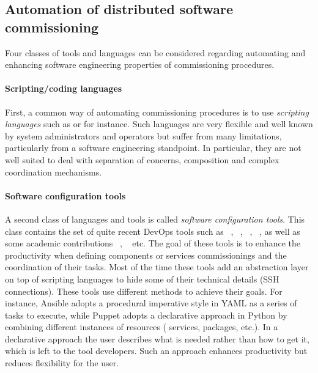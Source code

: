 
\subsection{Automation of distributed software commissioning}

Four classes of tools and languages can be considered regarding
automating and enhancing software engineering properties
of commissioning procedures.

\paragraph{Scripting/coding languages}
First, a common way of automating commissioning procedures is to use
\emph{scripting languages} such as \shell or \ruby for instance. Such
languages are very flexible and well known by system administrators
and operators but suffer from many limitations, particularly from a
software engineering standpoint. In particular, they are not well
suited to deal with separation of concerns, composition and complex
coordination mechanisms.

\paragraph{Software configuration tools}
A second class of languages and tools is called \emph{software
  configuration tools}. This class contains the set of quite recent
DevOps tools such as \ansible~\cite{ansible:web},
\puppet~\cite{puppet:web}, \chef~\cite{chef:web},
\salt~\cite{salt:web}, as well as some academic contributions
\deployware~\cite{flissi2008ccgrid},
\aeolus~\cite{dicosmo2014ic,dicosmo:hal-01233489} etc. The goal of
these tools is to enhance the productivity when defining components or
services commissionings and the coordination of their tasks. Most of
the time these tools add an abstraction layer on top of scripting languages
to hide some of their technical details (\eg SSH connections). These
tools use different methods to achieve their goals. For instance,
Ansible adopts a procedural imperative style in YAML as a
series of tasks to execute, while Puppet adopts a declarative approach
in Python by combining different instances of resources (\ie
services, packages, etc.). In a declarative approach the user describes
what is needed rather than how to get it, which is left to the tool
developers. Such an approach enhances productivity but reduces
flexibility for the user.

